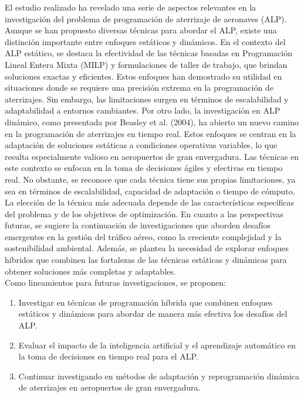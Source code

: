 \documentclass[letter, 10pt]{article}
\begin{document}
El estudio realizado ha revelado una serie de aspectos relevantes en la investigaci\'on del problema de programaci\'on de aterrizaje de aeronaves (ALP). Aunque se han propuesto diversas t\'ecnicas para abordar el ALP, existe una distinci\'on importante entre enfoques est\'aticos y din\'amicos. En el contexto del ALP est\'atico, se destaca la efectividad de las t\'ecnicas basadas en Programaci\'on Lineal Entera Mixta (MILP) y formulaciones de taller de trabajo, que brindan soluciones exactas y eficientes. Estos enfoques han demostrado su utilidad en situaciones donde se requiere una precisi\'on extrema en la programaci\'on de aterrizajes. Sin embargo, las limitaciones surgen en t\'erminos de escalabilidad y adaptabilidad a entornos cambiantes. Por otro lado, la investigaci\'on en ALP din\'amico, como presentada por Beasley et al. (2004), ha abierto un nuevo camino en la programaci\'on de aterrizajes en tiempo real. Estos enfoques se centran en la adaptaci\'on de soluciones est\'aticas a condiciones operativas variables, lo que resulta especialmente valioso en aeropuertos de gran envergadura. Las t\'ecnicas en este contexto se enfocan en la toma de decisiones \'agiles y efectivas en tiempo real. No obstante, se reconoce que cada t\'ecnica tiene sus propias limitaciones, ya sea en t\'erminos de escalabilidad, capacidad de adaptaci\'on o tiempo de c\'omputo. La elecci\'on de la t\'ecnica m\'as adecuada depende de las caracter\'isticas espec\'ificas del problema y de los objetivos de optimizaci\'on. En cuanto a las perspectivas futuras, se sugiere la continuaci\'on de investigaciones que aborden desaf\'ios emergentes en la gesti\'on del tr\'afico a\'ereo, como la creciente complejidad y la sostenibilidad ambiental. Adem\'as, se plantea la necesidad de explorar enfoques h\'ibridos que combinen las fortalezas de las t\'ecnicas est\'aticas y din\'amicas para obtener soluciones m\'as completas y adaptables. \\

Como lineamientos para futuras investigaciones, se proponen:

\begin{enumerate}
    \item Investigar en t\'ecnicas de programaci\'on h\'ibrida que combinen enfoques est\'aticos y din\'amicos para abordar de manera m\'as efectiva los desaf\'ios del ALP.
    
    \item Evaluar el impacto de la inteligencia artificial y el aprendizaje autom\'atico en la toma de decisiones en tiempo real para el ALP.
    
    \item Continuar investigando en m\'etodos de adaptaci\'on y reprogramaci\'on din\'amica de aterrizajes en aeropuertos de gran envergadura.
\end{enumerate}
\end{document}
